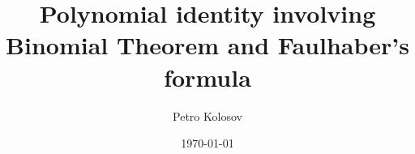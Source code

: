 \documentclass[12pt,letterpaper,oneside,reqno]{amsart}
\title[Polynomial identity involving Binomial Theorem and Faulhaber's formula]
{Polynomial identity involving Binomial Theorem and Faulhaber's formula}
\author[Petro Kolosov]{Petro Kolosov}
\date{\today}
\numberwithin{equation}{section}
\begin{document}
    \begin{abstract}
        
    \end{abstract}

    \maketitle

    \tableofcontents


%    
%
%
%    
%
%
%    
%
%
%    
%
%
%    
%
%
%    
%
%
%    

%    


%    
%
%
%    
%
%
%    
\end{document}
